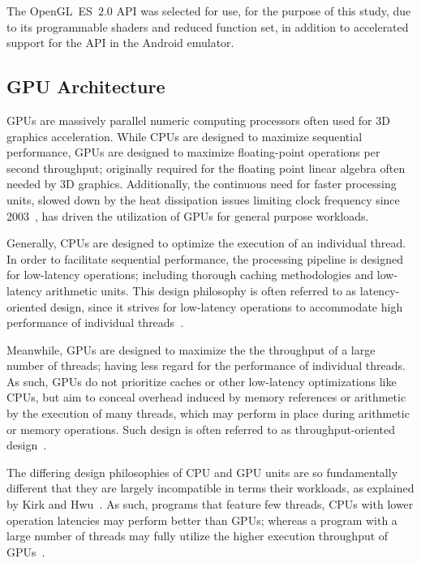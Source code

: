 The OpenGL~ES~$2.0$ API was selected for use, for the purpose of this study, due to its programmable shaders and reduced function set, in addition to accelerated support for the API in the Android emulator.

\subsection{GPU Architecture}
\label{sec:backgroundandrelatedwork_gpuarchitecture}
GPUs are massively parallel numeric computing processors often used for 3D graphics acceleration.
While CPUs are designed to maximize sequential performance, GPUs are designed to maximize floating-point operations per second throughput; originally required for the floating point linear algebra often needed by 3D graphics.
Additionally, the continuous need for faster processing units, slowed down by the heat dissipation issues limiting clock frequency since 2003~, has driven the utilization of GPUs for general purpose workloads.

Generally, CPUs are designed to optimize the execution of an individual thread.
In order to facilitate sequential performance, the processing pipeline is designed for low-latency operations; including thorough caching methodologies and low-latency arithmetic units.
This design philosophy is often referred to as latency-oriented design, since it strives for low-latency operations to accommodate high performance of individual threads~.

Meanwhile, GPUs are designed to maximize the the throughput of a large number of threads; having less regard for the performance of individual threads.
As such, GPUs do not prioritize caches or other low-latency optimizations like CPUs, but aim to conceal overhead induced by memory references or arithmetic by the execution of many threads, which may perform in place during arithmetic or memory operations.
Such design is often referred to as throughput-oriented design~.

The differing design philosophies of CPU and GPU units are so fundamentally different that they are largely incompatible in terms their workloads, as explained by Kirk and Hwu~.
As such, programs that feature few threads, CPUs with lower operation latencies may perform better than GPUs; whereas a program with a large number of threads may fully utilize the higher execution throughput of GPUs~.

